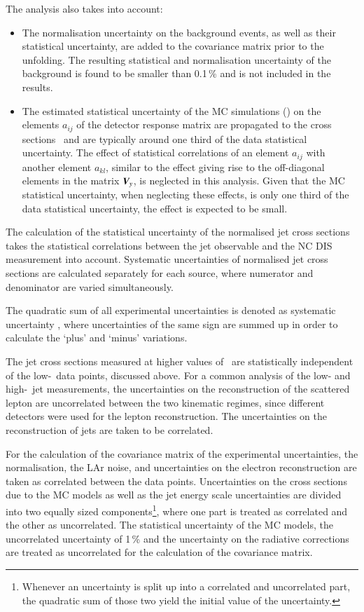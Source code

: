 \documentclass[12pt]{article}
\begin{document}
The analysis also takes into account:
\begin{itemize}
\item The normalisation uncertainty on the background events, as well as their statistical uncertainty,
are added to the covariance matrix prior to the unfolding.
The resulting statistical and normalisation uncertainty of the background is found to be smaller than 0.1\,\% and is not included in the results.

\item The estimated statistical uncertainty of the MC simulations (\DMCSt{}) on the elements $a_{ij}$ of the detector response matrix are propagated to the
cross sections~\cite{unfold} and are typically around one third of the data statistical uncertainty. 
The effect of statistical correlations of an element 
$a_{ij}$ with another element $a_{kl}$, similar to the effect 
giving rise to the off-diagonal elements in the matrix $\V_y$, is 
neglected in this analysis. 
Given that the MC statistical uncertainty, when neglecting these effects, is only one third of the 
data statistical uncertainty, the effect is expected to be small.
\end{itemize}

The calculation of the statistical uncertainty of the normalised jet cross sections takes the
 statistical correlations between the jet observable and the NC DIS measurement into account.
Systematic uncertainties of normalised jet cross sections are calculated separately for each source,
 where numerator and denominator are varied simultaneously.

The quadratic sum of all experimental uncertainties is denoted as systematic uncertainty {\DSys{\csdsub}}, 
where uncertainties of the same sign are summed up in order to calculate the `plus' and `minus' variations.

The jet cross sections measured at higher values of \Qsq\ are statistically independent 
of the low-\Qsq\ data points, discussed above.
For a common analysis of the low- and high-\Qsq\ jet measurements, the uncertainties on the reconstruction of the scattered lepton
 are uncorrelated between the two kinematic regimes, since different detectors were used for the lepton reconstruction.
The uncertainties on the reconstruction of jets are taken to be correlated.


For the calculation of the covariance matrix of the experimental uncertainties,
the normalisation, the LAr noise, and uncertainties on the electron reconstruction 
are taken as correlated between the data points.
Uncertainties on the cross sections due to the MC models as well as the jet energy 
scale uncertainties are divided into two equally sized components\footnote{Whenever an 
uncertainty is split up into a correlated and uncorrelated part, the quadratic sum of 
those two yield the initial value of the uncertainty.}, where one part is treated
as correlated and the other as uncorrelated.
The statistical uncertainty of the MC models, the uncorrelated uncertainty of 1\,\% and the
uncertainty on the radiative corrections are treated as uncorrelated for the calculation of the covariance matrix.
\end{document}
